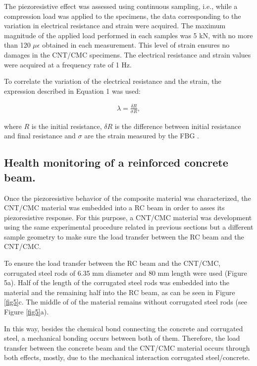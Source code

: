 \documentclass[twocolumn]{bmcart}%
\begin{document}
The piezoresistive effect was assessed using continuous sampling, i.e., while a compression load was applied to the specimens, the data corresponding to the variation in electrical resistance and strain were acquired. The maximum magnitude of the applied load performed in each samples was 5 kN, with no more than 120 $\mu\epsilon$ obtained in each measurement. This level of strain ensures no damages in the CNT/CMC specimens. The electrical resistance and strain values were acquired at a frequency rate of 1 Hz.

\begin{figure}[h!]
  \caption{
      }
    \label{fig4}
      \end{figure}

To correlate the variation of the electrical resistance and the strain, the expression described in Equation 1 was used:

\begin{eqnarray}\label{eqexpmuts}
\lambda = \frac{\delta R}{\sigma R},
\end{eqnarray}

    
where $R$ is the initial resistance, $\delta R$ is the difference between initial resistance and final resistance and $\sigma$ are the strain measured by the FBG \cite{Pisello2017, Jang2017}.

\subsection{Health monitoring of a reinforced concrete beam.}

Once  the piezoresistive behavior of the composite material was characterized, the CNT/CMC material was embedded into a RC beam in order to asses its piezoresistive response. For this purpose, a CNT/CMC material was development using the same experimental procedure related in previous sections but a different sample geometry to make sure the load transfer between the RC beam and the CNT/CMC.

To ensure the load transfer between the RC beam and the CNT/CMC, corrugated steel rods of 6.35 mm diameter and 80 mm length were used (Figure 5a). Half of the length of the corrugated steel rods was embedded into the material and the remaining half into the RC beam, as can be seen in Figure \ref{fig5}c. The middle of of the material remains without corrugated steel rods (see Figure \ref{fig5}a).

In this way, besides the chemical bond connecting the concrete and corrugated steel, a mechanical bonding occurs between both of them. Therefore, the load transfer between the concrete beam and the CNT/CMC material occurs through both effects, mostly, due to the mechanical interaction corrugated steel/concrete.
\end{document}

